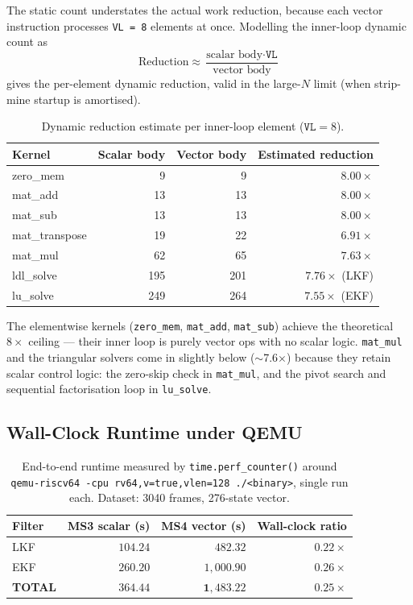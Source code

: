 \documentclass[11pt,a4paper]{article}
\begin{document}
The static count understates the actual work reduction, because each
vector instruction processes \texttt{VL = 8} elements at once. Modelling
the inner-loop dynamic count as
\[
\text{Reduction} \approx \frac{\text{scalar body} \cdot \texttt{VL}}{\text{vector body}}
\]
gives the per-element dynamic reduction, valid in the large-$N$ limit
(when strip-mine startup is amortised).

\begin{table}[h]
\centering
\caption{Dynamic reduction estimate per inner-loop element ($\texttt{VL}=8$).}
\begin{tabular}{lrrr}
\toprule
Kernel          & Scalar body & Vector body & Estimated reduction \\
\midrule
zero\_mem       & 9   & 9    & $8.00\times$ \\
mat\_add        & 13  & 13   & $8.00\times$ \\
mat\_sub        & 13  & 13   & $8.00\times$ \\
mat\_transpose  & 19  & 22   & $6.91\times$ \\
mat\_mul        & 62  & 65   & $7.63\times$ \\
ldl\_solve      & 195 & 201  & $7.76\times$ (LKF) \\
lu\_solve       & 249 & 264  & $7.55\times$ (EKF) \\
\bottomrule
\end{tabular}
\end{table}

The elementwise kernels (\texttt{zero\_mem}, \texttt{mat\_add},
\texttt{mat\_sub}) achieve the theoretical $8\times$ ceiling --- their
inner loop is purely vector ops with no scalar logic. \texttt{mat\_mul}
and the triangular solvers come in slightly below ($\sim$7.6$\times$)
because they retain scalar control logic: the zero-skip check in
\texttt{mat\_mul}, and the pivot search and sequential factorisation
loop in \texttt{lu\_solve}.

\subsection{Wall-Clock Runtime under QEMU}

\begin{table}[h]
\centering
\caption{End-to-end runtime measured by \texttt{time.perf\_counter()}
around \texttt{qemu-riscv64 -cpu rv64,v=true,vlen=128 ./<binary>},
single run each. Dataset: 3040 frames, 276-state vector.}
\begin{tabular}{lrrr}
\toprule
Filter           & MS3 scalar (s)  & MS4 vector (s) & Wall-clock ratio \\
\midrule
LKF              & $104.24$         & $482.32$         & $0.22\times$ \\
EKF              & $260.20$         & $1{,}000.90$     & $0.26\times$ \\
\midrule
\textbf{TOTAL}   & $\mathbf{364.44}$ & $\mathbf{1{,}483.22}$ & $\mathbf{0.25\times}$ \\
\bottomrule
\end{tabular}
\end{table}
\end{document}
